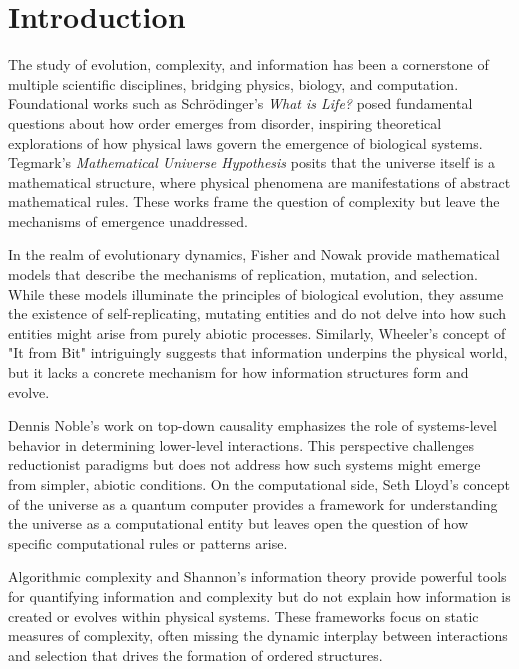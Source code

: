 \documentclass[entropy,article,submit,pdftex,moreauthors]{Definitions/mdpi}
\begin{document}


\section{Introduction}

The study of evolution, complexity, and information has been a cornerstone of multiple scientific disciplines, bridging physics, biology, and computation. Foundational works such as Schrödinger's \textit{What is Life?} \cite{schrodinger1944life} posed fundamental questions about how order emerges from disorder, inspiring theoretical explorations of how physical laws govern the emergence of biological systems. Tegmark's \textit{Mathematical Universe Hypothesis} \cite{tegmark2008mathematical} posits that the universe itself is a mathematical structure, where physical phenomena are manifestations of abstract mathematical rules. These works frame the question of complexity but leave the mechanisms of emergence unaddressed.

In the realm of evolutionary dynamics, Fisher \cite{fisher1930genetical} and Nowak \cite{nowak2006evolutionary} provide mathematical models that describe the mechanisms of replication, mutation, and selection. While these models illuminate the principles of biological evolution, they assume the existence of self-replicating, mutating entities and do not delve into how such entities might arise from purely abiotic processes. Similarly, Wheeler's concept of "It from Bit" \cite{wheeler1990itbit} intriguingly suggests that information underpins the physical world, but it lacks a concrete mechanism for how information structures form and evolve.

Dennis Noble's work on top-down causality \cite{noble2012causality} emphasizes the role of systems-level behavior in determining lower-level interactions. This perspective challenges reductionist paradigms but does not address how such systems might emerge from simpler, abiotic conditions. On the computational side, Seth Lloyd’s concept of the universe as a quantum computer \cite{lloyd2006programming} provides a framework for understanding the universe as a computational entity but leaves open the question of how specific computational rules or patterns arise.

Algorithmic complexity \cite{kolmogorov1965complexity} \cite{chaitin1977algorithmic} \cite{solomonoff1964formal} and Shannon’s information theory \cite{shannon1948mathematical} provide powerful tools for quantifying information and complexity but do not explain how information is created or evolves within physical systems. These frameworks focus on static measures of complexity, often missing the dynamic interplay between interactions and selection that drives the formation of ordered structures.
\end{document}
